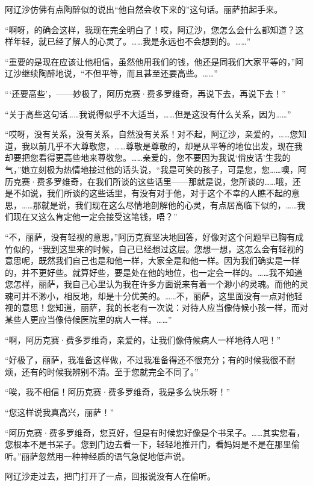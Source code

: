 \par 阿辽沙仿佛有点陶醉似的说出“他自然会收下来的”这句话。丽萨拍起手来。
\par “啊呀，的确会这样，我现在完全明白了！哎，阿辽沙，您怎么会什么都知道？这样年轻，就已经了解人的心灵了。……我是永远也不会想到的。……”
\par “重要的是现在应该让他相信，虽然他用我们的钱，他还是同我们大家平等的，”阿辽沙继续陶醉地说，“不但平等，而且甚至还要高些。……”
\par “‘还要高些’，——妙极了，阿历克赛·费多罗维奇，再说下去，再说下去！”
\par “关于高些这句话……我说得似乎不大适当，……但是这没有什么关系，因为……”
\par “哎呀，没有关系，没有关系，自然没有关系！对不起，阿辽沙，亲爱的，……您知道，我以前几乎不大尊敬您，……尊敬是尊敬的，却是从平等的地位出发，现在我却要把您看得更高些地来尊敬您。……亲爱的，您不要因为我说‘俏皮话’生我的气，”她立刻极为热情地接过他的话头说，“我是可笑的孩子，可是您，您……噢，阿历克赛·费多罗维奇，在我们所谈的这些话里——那就是说，您所谈的……哦，还是不如说，我们所谈的这些话里，有没有对于他，对于这个不幸的人瞧不起的意思，……那就是说，我们现在这么尽情地剖解他的心灵，有点居高临下似的，……我们现在又这么肯定他一定会接受这笔钱，唔？”
\par “不，丽萨，没有轻视的意思，”阿历克赛坚决地回答，好像对这个问题早已胸有成竹似的，“我到这里来的时候，自己已经想过这层。您想一想，这怎么会有轻视的意思呢，既然我们自己也是和他一样，大家全是和他一样。因为我们确实是一样的，并不更好些。就算好些，要是处在他的地位，也一定会一样的。……我不知道您怎样，丽萨，我自己心里认为我在许多方面说来有着一个渺小的灵魂。而他的灵魂可并不渺小，相反地，却是十分优美的。……不，丽萨，这里面没有一点对他轻视的意思！您知道，丽萨，我的长老有一次说：对待人应当像侍候小孩一样，而对某些人更应当像侍候医院里的病人一样。……”
\par “啊，阿历克赛·费多罗维奇，亲爱的，让我们像侍候病人一样地待人吧！”
\par “好极了，丽萨，我准备这样做，不过我准备得还不很充分；有的时候我很不耐烦，还有的时候我辨别不清。至于您就完全不同了。”
\par “唉，我不相信！阿历克赛·费多罗维奇，我是多么快乐呀！”
\par “您这样说我真高兴，丽萨！”
\par “阿历克赛·费多罗维奇，您真好，但是有时候您好像是个书呆子。……其实您看，您根本不是书呆子。您到门边去看一下，轻轻地推开门，看妈妈是不是在那里偷听。”丽萨忽然用一种神经质的语气急促地低声说。
\par 阿辽沙走过去，把门打开了一点，回报说没有人在偷听。

